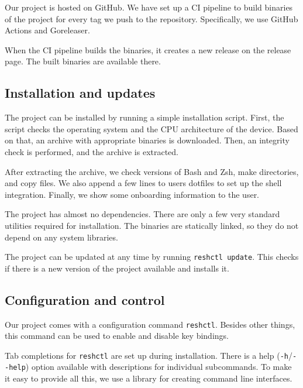 Our project is hosted on GitHub\cite{resh-github-homepage}. We have set up a CI pipeline to build binaries of the project for every tag we push to the repository. Specifically, we use GitHub Actions\cite{github-actions} and Goreleaser\cite{tools-goreleaser}.

When the CI pipeline builds the binaries, it creates a new release on the release page\cite{resh-github-releases}. The built binaries are available there. 

\subsection{Installation and updates}

The project can be installed by running a simple installation script.
First, the script checks the operating system and the CPU architecture of the device. Based on that, an archive with appropriate binaries is downloaded. Then, an integrity check is performed, and the archive is extracted. 

After extracting the archive, we check versions of Bash and Zsh, make directories, and copy files. We also append a few lines to users dotfiles to set up the shell integration. Finally, we show some onboarding information to the user.

The project has almost no dependencies. There are only a few very standard utilities required for installation. The binaries are statically linked, so they do not depend on any system libraries.

The project can be updated at any time by running \verb|reshctl update|. This checks if there is a new version of the project available and installs it.

\subsection{Configuration and control}

Our project comes with a configuration command \verb|reshctl|. Besides other things, this command can be used to enable and disable key bindings. 

Tab completions for \verb|reshctl| are set up during installation. There is a help (\verb|-h|/\verb|--help|) option available with descriptions for individual subcommands. To make it easy to provide all this, we use a library\cite{lib-go-cobra} for creating command line interfaces.
